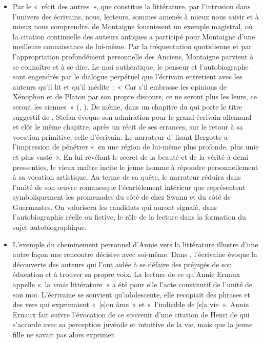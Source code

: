 {\begin{itemize}[label=\textbullet]
\item Par le «~récit des autres~», que constitue la littérature, par l'intrusion dans l'univers
des écrivains, nous, lecteurs, sommes amenés à mieux nous saisir et à mieux nous
comprendre.  de Montaigne fournissent un exemple magistral, où la citation
continuelle des auteurs antiques a participé pour Montaigne d'une meilleure
connaissance de lui-même. Par la fréquentation quotidienne et par l'appropriation
profondément personnelle des Anciens, Montaigne parvient à se connaître et à se dire. Le moi authentique, le penseur et l'autobiographe sont engendrés par le dialogue
perpétuel que l'écrivain entretient avec les auteurs qu'il lit et qu'il médite~: «~Car s'il
embrasse les opinions de Xénophon et de Platon par son propre discours, ce ne seront
plus les leurs, ce seront les siennes~» (, ). De même, dans un chapitre
du  qui porte le titre suggestif de , Stefan  évoque son admiration pour le grand écrivain allemand 
et clôt le même chapitre, après un récit de ses errances, sur le retour à sa vocation
primitive, celle d'écrivain. Le narrateur d' lisant Bergotte
a l'impression de pénétrer «~en une région de lui-même plus profonde, plus unie et
plus vaste~». En lui révélant le secret de la beauté et de la vérité à demi pressenties,
le vieux maître incite le jeune homme à répondre personnellement à sa vocation
artistique. Au terme de sa quête, le narrateur réduira dans l'unité de son œuvre
romanesque l'écartèlement intérieur que représentent symboliquement les
promenades du côté de chez Swann et du côté de Guermantes. On valorisera les
candidats qui auront signalé, dans l'autobiographie réelle ou fictive, le rôle de la lecture
dans la formation du sujet autobiographique.

\item L'exemple du cheminement personnel d'Annie  vers la littérature illustre d'une
autre façon une rencontre décisive avec soi-même. Dans , l'écrivaine évoque
la découverte des auteurs qui l'ont aidée à se défaire des préjugés de son éducation
et à trouver sa propre voix. La lecture de ce qu'Annie Ernaux appelle «~la \emph{vraie}
littérature~» a été pour elle l'acte constitutif de l'unité de son moi. L'écrivaine se
souvient qu'adolescente, elle recopiait des phrases et des vers qui exprimaient «~[s]on
âme~» et «~l'indicible de [s]a vie~». Annie Ernaux fait suivre l'évocation de ce souvenir
d'une citation de Henri de  qui s'accorde avec sa perception juvénile et intuitive
de la vie, mais que la jeune fille ne savait pas alors exprimer.


\end{itemize}}
